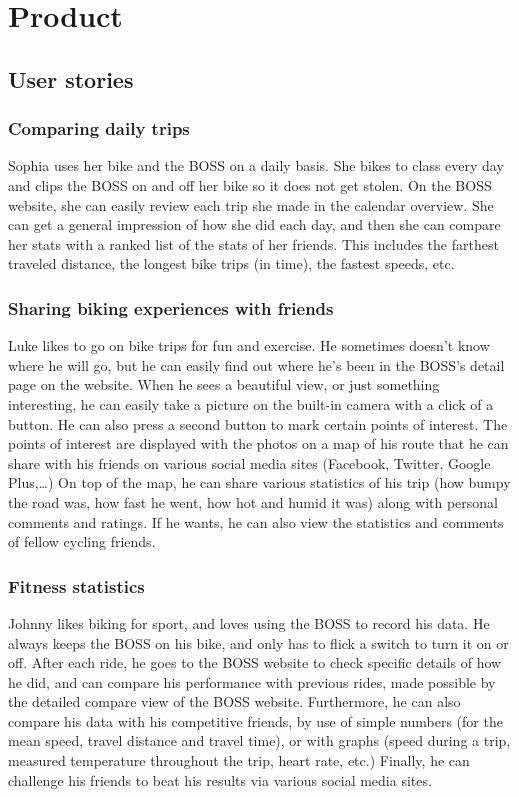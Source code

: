 \section{Product}
\label{section:product}
\subsection{User stories}
\subsubsection{Comparing daily trips}
Sophia uses her bike and the BOSS on a daily basis. 
She bikes to class every day and clips the BOSS on and off her bike so it does not get stolen. 
On the BOSS website, she can easily review each trip she made in the calendar overview. 
She can get a general impression of how she did each day, and then she can compare her stats with a ranked list of the stats of her friends. 
This includes the farthest traveled distance, the longest bike trips (in time), the fastest speeds, etc.

\subsubsection{Sharing biking experiences with friends}
Luke likes to go on bike trips for fun and exercise. 
He sometimes doesn’t know where he will go, but he can easily find out where he’s been in the BOSS’s detail page on the website. 
When he sees a beautiful view, or just something interesting, he can easily take a picture on the built-in camera with a click of a button. 
He can also press a second button to mark certain points of interest. 
The points of interest are displayed with the photos on a map of his route that he can share with his friends on various social media sites (Facebook, Twitter, Google Plus,…) On top of the map, he can share various statistics of his trip (how bumpy the road was, how fast he went, how hot and humid it was) along with personal comments and ratings. 
If he wants, he can also view the statistics and comments of fellow cycling friends. 

\subsubsection{Fitness statistics}
Johnny likes biking for sport, and loves using the BOSS to record his data. 
He always keeps the BOSS on his bike, and only has to flick a switch to turn it on or off. 
After each ride, he goes to the BOSS website to check specific details of how he did, and can compare his performance with previous rides, made possible by the detailed compare view of the BOSS website. 
Furthermore, he can also compare his data with his competitive friends, by use of simple numbers (for the mean speed, travel distance and travel time), or with graphs (speed during a trip, measured temperature throughout the trip, heart rate, etc.) Finally, he can challenge his friends to beat his results via various social media sites.


